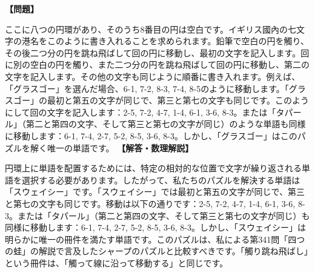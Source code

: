 \documentclass[10pt,a4paper,oneside,openany]{ltjsbook}
\begin{document}
\begin{tcolorbox}[colback=softblue,colframe=primaryblue,title=\textbf{第 226 問：海岸を一周する （原題: ROUND THE COAST.）},arc=2mm,boxrule=1pt,breakable]
\textbf{【問題】}\par\vspace{0.3em}
ここに八つの円環があり、そのうち8番目の円は空白です。イギリス國內の七文字の港名をこのように書き入れることを求められます。鉛筆で空白の円を觸り、その後二つ分の円を跳ね飛ばして回の円に移動し、最初の文字を記入します。回に別の空白の円を觸り、また二つ分の円を跳ね飛ばして回の円に移動し、第二の文字を記入します。その他の文字も同じように順番に書き入れます。例えば、「グラスゴー」を選んだ場合、6-1, 7-2, 8-3, 7-4, 8-5のように移動します。「グラスゴー」の最初と第五の文字が同じで、第三と第七の文字も同じです。このようにして回の文字を記入します：2-5, 7-2, 4-7, 1-4, 6-1, 3-6, 8-3。または「タパール」（第二と第四の文字、そして第三と第七の文字が同じ）のような単語も同様に移動します：6-1, 7-4, 2-7, 5-2, 8-5, 3-6, 8-3。しかし、「グラスゴー」はこのパズルを解く唯一の単語です。
\tcblower
\textbf{【解答・数理解説】}\par\vspace{0.3em}
円環上に単語を配置するためには、特定の相対的な位置で文字が繰り返される単語を選択する必要があります。したがって、私たちのパズルを解決する単語は「スウェイシー」です。「スウェイシー」では最初と第五の文字が同じで、第三と第七の文字も同じです。移動は以下の通りです：2-5, 7-2, 4-7, 1-4, 6-1, 3-6, 8-3。または「タパール」（第二と第四の文字、そして第三と第七の文字が同じ）も同様に移動します：6-1, 7-4, 2-7, 5-2, 8-5, 3-6, 8-3。しかし、「スウェイシー」は明らかに唯一の冊件を満たす単語です。このパズルは、私による第341問「四つの蛙」の解説で言及したシャープのパズルと比較すべきです。「觸り跳ね飛ばし」という冊件は、「觸って線に沿って移動する」と同じです。
\end{tcolorbox}
\end{document}
